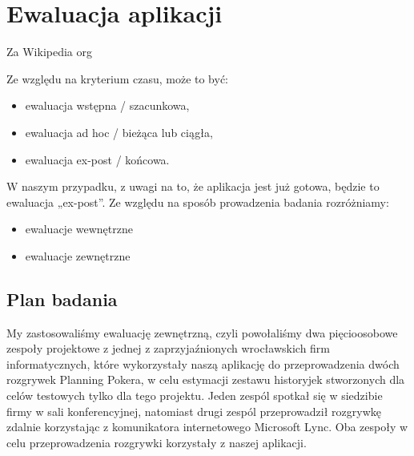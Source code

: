\chapter{Ewaluacja aplikacji}

Za Wikipedia org 
\begin{quote}
\end{quote}
Ze względu na kryterium czasu, może to być:
\begin{itemize}
	\item ewaluacja wstępna / szacunkowa,
	\item ewaluacja ad hoc / bieżąca lub ciągła,
	\item ewaluacja ex-post / końcowa.
\end{itemize}
W naszym przypadku, z uwagi na to, że aplikacja jest już gotowa, będzie to ewaluacja „ex-post”. \newline
Ze względu na sposób prowadzenia badania rozróżniamy:
\begin{itemize}
	\item ewaluacje wewnętrzne
	\item ewaluacje zewnętrzne
\end{itemize}

\section{Plan badania}
My zastosowaliśmy ewaluację zewnętrzną, czyli powołaliśmy dwa pięcioosobowe zespoły projektowe z
jednej z zaprzyjaźnionych wrocławskich firm informatycznych, które wykorzystały naszą aplikację do
przeprowadzenia dwóch rozgrywek Planning Pokera, w celu estymacji zestawu historyjek stworzonych dla
celów testowych tylko dla tego projektu. Jeden zespól spotkał się w siedzibie firmy w sali konferencyjnej,
natomiast drugi zespól przeprowadził rozgrywkę zdalnie korzystając z komunikatora internetowego Microsoft
Lync. Oba zespoły w celu przeprowadzenia rozgrywki korzystały z naszej aplikacji.
